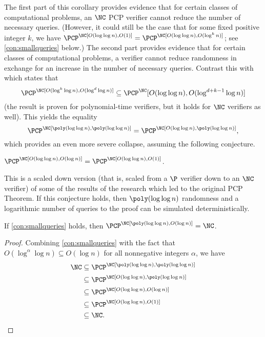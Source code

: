 The first part of this corollary provides evidence that for certain classes of computational problems, an $\NC$ PCP verifier cannot reduce the number of necessary queries.
(However, it could still be the case that for some fixed positive integer $k$, we have $\PCP^\NC[O(\loglog n), O(1)] = \PCP^\NC[O(\loglog n), O(\log^k n)]$; see \autoref{con:smallqueries} below.)
The second part provides evidence that for certain classes of computational problems, a verifier cannot reduce randomness in exchange for an increase in the number of necessary queries.
Contrast this with \autocite[Corollary~10]{fs96} which states that
\begin{equation*}
  \PCP^\NC[O(\log^k \log n), O(\log^d \log n)] \subseteq \PCP^\NC[O(\loglog n), O(\log^{d + k - 1} \log n)]
\end{equation*}
(the result is proven for polynomial-time verifiers, but it holds for $\NC$ verifiers as well).
This yields the equality
\begin{equation*}
  \PCP^\NC[\poly(\loglog n), \poly(\loglog n)] = \PCP^\NC[O(\loglog n), \poly(\loglog n)],
\end{equation*}
which provides an even more severe collapse, assuming the following conjecture.
\begin{conjecture}\label{con:smallqueries}
  $\PCP^\NC[O(\loglog n), O(\log n)] = \PCP^\NC[O(\loglog n), O(1)]$.
\end{conjecture}
This is a scaled down version (that is, scaled from a $\P$ verifier down to an $\NC$ verifier) of some of the results of the research which led to the original PCP Theorem.
If this conjecture holds, then $\poly(\loglog n)$ randomness and a logarithmic number of queries to the proof can be simulated deterministically.
\begin{theorem}
  If \autoref{con:smallqueries} holds, then $\PCP^\NC[\poly(\loglog n), O(\log n)] = \NC$.
\end{theorem}
\begin{proof}
  Combining \autoref{con:smallqueries} with the fact that $O(\log^\alpha \log n) \subseteq O(\log n)$ for all nonnegative integers $\alpha$, we have
  \begin{align*}
    \NC & \subseteq \PCP^\NC[\poly(\loglog n), \poly(\loglog n)] \\
    & \subseteq \PCP^\NC[O(\loglog n), \poly(\loglog n)] \\
    & \subseteq \PCP^\NC[O(\loglog n), O(\log n)] \\
    & \subseteq \PCP^\NC[O(\loglog n), O(1)] \\
    & \subseteq \NC.
    \qedhere
  \end{align*}
\end{proof}

